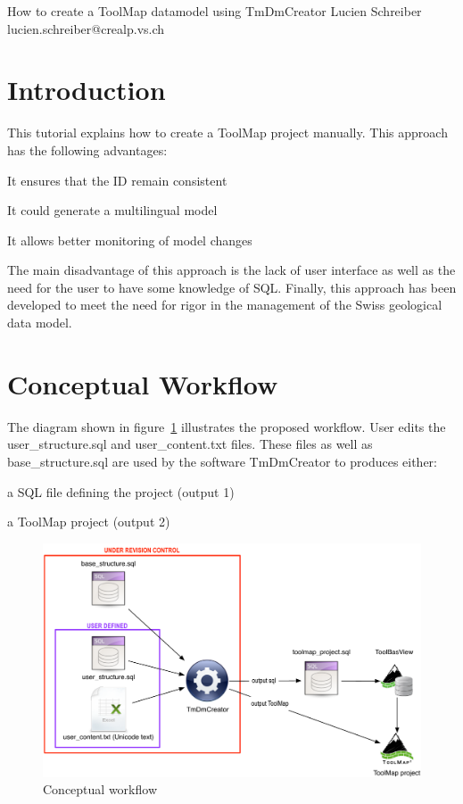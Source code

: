 \documentclass[a4paper, 12pt]{article}
\begin{document}
 {How to create a ToolMap datamodel using TmDmCreator} {Lucien Schreiber} {lucien.schreiber@crealp.vs.ch}
\tableofcontents
\pagebreak

\section{Introduction}
This tutorial explains how to create a ToolMap project manually. This approach has the following advantages:
\begin{enumerate*}
  \item It ensures that the ID remain consistent
  \item It could generate a multilingual model
  \item It allows better monitoring of model changes
\end{enumerate*}
The main disadvantage of this approach is the lack of user interface as well as the need for the user to have some knowledge of SQL. Finally, this approach has been developed to meet the need for rigor in the management of the Swiss geological data model.


\section{Conceptual Workflow}
The diagram shown in figure~\ref{fig:conceptual-workflow} illustrates the proposed workflow. User edits the user\_structure.sql and user\_content.txt files. These files as well as base\_structure.sql are used by the software TmDmCreator to produces either:
\begin{enumerate*}
  \item	a SQL file defining the project (output 1)
  \item	a ToolMap project (output 2)
\end{enumerate*}

\begin{figure} [htbp]
	\centering
    \includegraphics[width=1\textwidth]{img/workflow.pdf}
    \caption{Conceptual workflow}
    \label{fig:conceptual-workflow}
\end{figure}
\end{document}
